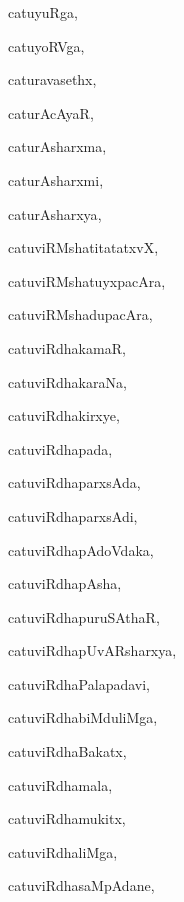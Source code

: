 \begin{multicols}{3}
{\noindent
{catuyuRga}, \pageref{catuyuRga}

\noindent
{catuyoRVga}, \pageref{catuyoRVga}

\noindent
{caturavasethx}, \pageref{caturavasethx}

\noindent
{caturAcAyaR}, \pageref{caturAcAyaR}

\noindent
{caturAsharxma}, \pageref{caturAsharxma}

\noindent
{caturAsharxmi}, \pageref{caturAsharxmi}

\noindent
{caturAsharxya}, \pageref{caturAsharxya}

\noindent
{catuviRMshatitatatxvX}, \pageref{catuviRMshatitatatxvX}

\noindent
{catuviRMshatuyxpacAra}, \pageref{catuviRMshatuyxpacAra}

\noindent
{catuviRMshadupacAra}, \pageref{catuviRMshadupacAra}

\noindent
{catuviRdhakamaR}, \pageref{catuviRdhakamaR}

\noindent
{catuviRdhakaraNa}, \pageref{catuviRdhakaraNa}

\noindent
{catuviRdhakirxye}, \pageref{catuviRdhakirxye}

\noindent
{catuviRdhapada}, \pageref{catuviRdhapada}

\noindent
{catuviRdhaparxsAda}, \pageref{catuviRdhaparxsAda}

\noindent
{catuviRdhaparxsAdi}, \pageref{catuviRdhaparxsAdi}

\noindent
{catuviRdhapAdoVdaka}, \pageref{catuviRdhapAdoVdaka}

\noindent
{catuviRdhapAsha}, \pageref{catuviRdhapAsha}

\noindent
{catuviRdhapuruSAthaR}, \pageref{catuviRdhapuruSAthaR}

\noindent
{catuviRdhapUvARsharxya}, \pageref{catuviRdhapUvARsharxya}

\noindent
{catuviRdhaPalapadavi}, \pageref{catuviRdhaPalapadavi}

\noindent
{catuviRdhabiMduliMga}, \pageref{catuviRdhabiMduliMga}

\noindent
{catuviRdhaBakatx}, \pageref{catuviRdhaBakatx}

\noindent
{catuviRdhamala}, \pageref{catuviRdhamala}

\noindent
{catuviRdhamukitx}, \pageref{catuviRdhamukitx}

\noindent
{catuviRdhaliMga}, \pageref{catuviRdhaliMga}

\noindent
{catuviRdhasaMpAdane}, \pageref{catuviRdhasaMpAdane}

}
\end{multicols}
